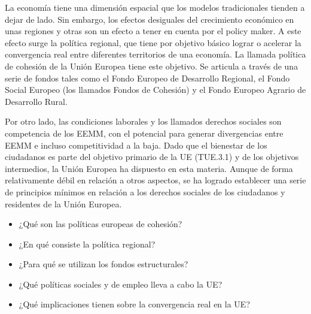 \documentclass{nuevotema}
\begin{document}
\ideaclave

La economía tiene una dimensión espacial que los modelos tradicionales tienden a dejar de lado. Sin embargo, los efectos desiguales del crecimiento económico en unas regiones y otras son un efecto a tener en cuenta por el policy maker. A este efecto surge la política regional, que tiene por objetivo básico lograr o acelerar la convergencia real entre diferentes territorios de una economía. La llamada política de cohesión de la Unión Europea tiene este objetivo. Se articula a través de una serie de fondos tales como el Fondo Europeo de Desarrollo Regional, el Fondo Social Europeo (los llamados Fondos de Cohesión) y el Fondo Europeo Agrario de Desarrollo Rural.

Por otro lado, las condiciones laborales y los llamados derechos sociales son competencia de los EEMM, con el potencial para generar divergencias entre EEMM e incluso competitividad a la baja. Dado que el bienestar de los ciudadanos es parte del objetivo primario de la UE (TUE.3.1) y de los objetivos intermedios, la Unión Europea ha dispuesto en esta materia. Aunque de forma relativamente débil en relación a otros aspectos, se ha logrado establecer una serie de principios mínimos en relación a los derechos sociales de los ciudadanos y residentes de la Unión Europea.


\begin{itemize}
	\item ¿Qué son las políticas europeas de cohesión?
	\item ¿En qué consiste la política regional?
	\item ¿Para qué se utilizan los fondos estructurales?
	\item ¿Qué políticas sociales y de empleo lleva a cabo la UE?
	\item ¿Qué implicaciones tienen sobre la convergencia real en la UE?
\end{itemize}

\esquemacorto
\end{document}
